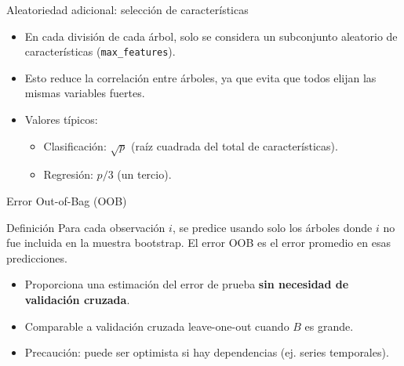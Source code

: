\documentclass[aspectratio=169, 10pt, xcolor=table]{beamer}
\begin{document}
\begin{frame}{Aleatoriedad adicional: selección de características}
    \begin{itemize}
        \item En cada división de cada árbol, solo se considera un subconjunto aleatorio de características (\texttt{max\_features}).
        \item Esto reduce la correlación entre árboles, ya que evita que todos elijan las mismas variables fuertes.
        \item Valores típicos:
        \begin{itemize}
            \item Clasificación: $\sqrt{p}$ (raíz cuadrada del total de características).
            \item Regresión: $p/3$ (un tercio).
        \end{itemize}
    \end{itemize}
\end{frame}

\begin{frame}{Error Out-of-Bag (OOB)}
    \begin{block}{Definición}
        Para cada observación $i$, se predice usando solo los árboles donde $i$ no fue incluida en la muestra bootstrap. El error OOB es el error promedio en esas predicciones.
    \end{block}
    \begin{itemize}
        \item Proporciona una estimación del error de prueba \textbf{sin necesidad de validación cruzada}.
        \item Comparable a validación cruzada leave-one-out cuando $B$ es grande.
        \item Precaución: puede ser optimista si hay dependencias (ej. series temporales).
    \end{itemize}
\end{frame}
\end{document}

